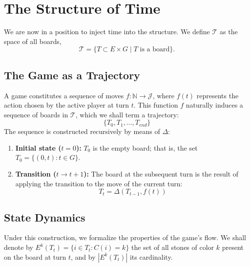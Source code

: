 \section{The Structure of Time}

We are now in a position to inject time into the structure. We define \(\mathcal{T}\) as the space of all boards,
$$ \mathcal{T} = \{ T \subset E \times G \mid T \text{ is a board}\}.$$

\subsection{The Game as a Trajectory}
A game constitutes a sequence of moves $f:\mathbb{N} \rightarrow \mathcal{J}$, where $f(t)$ represents the action chosen by the active player at turn $t$. This function $f$ naturally induces a sequence of boards in $\mathcal{T}$, which we shall term a trajectory:
$$\{T_0, T_1, \dots, T_{end}\}$$
The sequence is constructed recursively by means of $\Delta$:

\begin{enumerate}
	\item \textbf{Initial state (\(t=0\)):} \(T_0\) is the empty board; that is, the set \(T_0 = \{(0, t) : t \in G\}\).
	\item \textbf{Transition (\(t \rightarrow t+1\)):} The board at the subsequent turn is the result of applying the transition to the move of the current turn:
	$$T_t = \Delta(T_{t-1}, f(t))$$
	\end{enumerate}

\subsection{State Dynamics}

Under this construction, we formalize the properties of the game's flow. We shall denote by \(E^k(T_t) = \{i \in T_t : C(i) = k\}\) the set of all stones of color \(k\) present on the board at turn \(t\), and by \(|E^k(T_t)|\) its cardinality.

